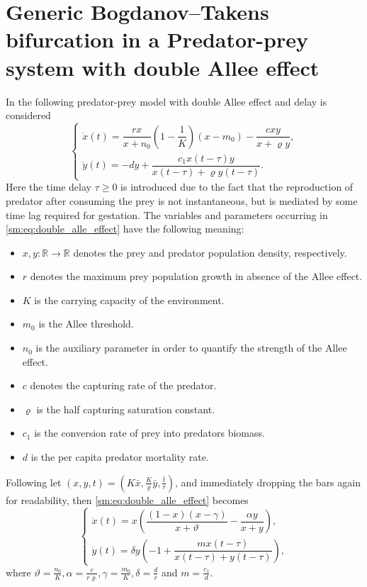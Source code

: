 \section[Predator-prey system with double Allee effect]
        {Generic Bogdanov--Takens bifurcation in a Predator-prey system with double Allee effect}
In \cite{Jiao2021} the following predator-prey model with double Allee effect
and delay is considered
\begin{equation}
\label{sm:eq:double_alle_effect}
\begin{cases}
    \dot x(t) = \dfrac{rx}{x+n_0}\left(1-\dfrac1 K\right)\left(x - m_0\right) - \dfrac{cxy}{x+\varrho y},\\
    \dot y(t) = -dy + \dfrac{c_1 x(t-\tau)y}{x(t-\tau) + \varrho y(t-\tau)}.
\end{cases}
\end{equation}
Here the time delay $\tau \geq 0$ is introduced due to the fact that the
reproduction of predator after consuming the prey is not instantaneous, but is
mediated by some time lag required for gestation.
The variables and parameters occurring in \cref{sm:eq:double_alle_effect}
have the following meaning:
\begin{itemize}
\item $x,y\colon \mathbb R \rightarrow \mathbb R$ denotes the prey and predator population density, respectively.
\item $r$ denotes the maximum prey population growth in absence of the Allee effect.
\item $K$ is the carrying capacity of the environment.
\item $m_0$ is the Allee threshold.
\item $n_0$ is the auxiliary parameter in order to quantify the strength of the Allee effect.
\item $c$ denotes the capturing rate of the predator.
\item $\varrho$ is the half capturing saturation constant.
\item $c_1$ is the conversion rate of prey into predators biomass.
\item $d$ is the per capita predator mortality rate.
\end{itemize}
Following \cite{Jiao2021} let $(x,y,t) = \left(K\bar x, \frac K \varrho \bar y, \frac{\bar t}r\right)$, and immediately 
dropping the bars again for readability, then \cref{sm:eq:double_alle_effect} becomes
\begin{equation}
\label{sm:eq:double_alle_effect_rescaled}
\begin{cases}
    \dot x(t) = x \left( \dfrac{(1-x)(x-\gamma)}{x+\vartheta} - \dfrac{\alpha y}{x+y} \right), \\
    \dot y(t) = \delta y \left( -1 + \dfrac{ m x(t-\tau) }{ x(t-\tau) + y(t-\tau) }\right),
\end{cases}
\end{equation}
where $\vartheta = \frac{n_0}K, \alpha=\frac c{r\varrho}, \gamma = \frac{m_0}K, \delta = \frac dr$ and $m=\frac{c_1}d$.


